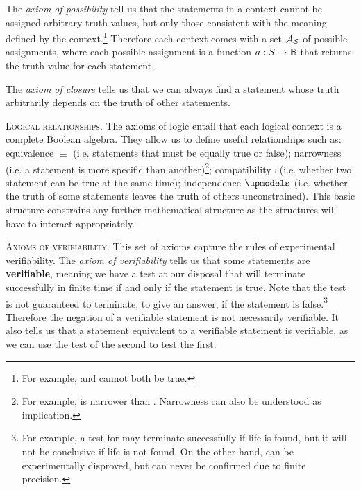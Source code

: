 \documentclass[10pt,twocolumn, nofootinbib]{revtex4-1}
\newcommand\partitle[1]{\textsc{#1}.}
\begin{document}
The \emph{axiom of possibility} tell us that the statements in a context cannot be assigned arbitrary truth values, but only those consistent with the meaning defined by the context.\footnote{For example,  and  cannot both be true.} Therefore each context comes with a set $\mathcal{A}_{\mathcal{S}}$ of possible assignments, where each possible assignment is a function $a : \mathcal{S} \to \mathbb{B}$ that returns the truth value for each statement.

The \emph{axiom of closure} tells us that we can always find a statement whose truth arbitrarily depends on the truth of other statements.

\partitle{Logical relationships} The axioms of logic entail that each logical context is a complete Boolean algebra. They allow us to define useful relationships such as: equivalence $\equiv$ (i.e. statements that must be equally true or false); narrowness (i.e. a statement is more specific than another)\footnote{For example,  is narrower than . Narrowness can also be understood as implication.}; compatibility $\comp$ (i.e. whether two statement can be true at the same time); independence $\indep$ (i.e. whether the truth of some statements leaves the truth of others unconstrained). This basic structure constrains any further mathematical structure as the structures will have to interact appropriately.

\partitle{Axioms of verifiability} This set of axioms capture the rules of experimental verifiability. The \emph{axiom of verifiability} tells us that some statements are \textbf{verifiable}, meaning we have a test at our disposal that will terminate successfully in finite time if and only if the statement is true. Note that the test is not guaranteed to terminate, to give an answer, if the statement is false.\footnote{For example, a test for  may terminate successfully if life is found, but it will not be conclusive if life is not found. On the other hand,  can be experimentally disproved, but can never be confirmed due to finite precision.} Therefore the negation of a verifiable statement is not necessarily verifiable. It also tells us that a statement equivalent to a verifiable statement is verifiable, as we can use the test of the second to test the first.
\end{document}
